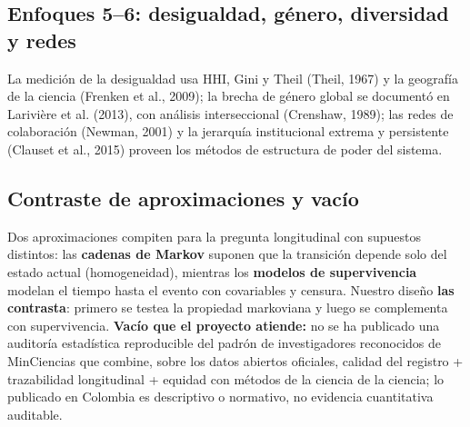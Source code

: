 \subsection{Enfoques 5--6: desigualdad, género, diversidad y redes}

La medición de la desigualdad usa HHI, Gini y Theil (Theil, 1967) y la
geografía de la ciencia (Frenken et al., 2009); la brecha de género global se
documentó en Larivière et al. (2013), con análisis interseccional (Crenshaw,
1989); las redes de colaboración (Newman, 2001) y la jerarquía institucional
extrema y persistente (Clauset et al., 2015) proveen los métodos de estructura
de poder del sistema.

\subsection{Contraste de aproximaciones y vacío}

Dos aproximaciones compiten para la pregunta longitudinal con supuestos
distintos: las \textbf{cadenas de Markov} suponen que la transición depende
solo del estado actual (homogeneidad), mientras los \textbf{modelos de
supervivencia} modelan el tiempo hasta el evento con covariables y censura.
Nuestro diseño \textbf{las contrasta}: primero se testea la propiedad
markoviana y luego se complementa con supervivencia. \textbf{Vacío que el
proyecto atiende:} no se ha publicado una auditoría estadística reproducible
del padrón de investigadores reconocidos de MinCiencias que combine, sobre los
datos abiertos oficiales, calidad del registro + trazabilidad longitudinal +
equidad con métodos de la ciencia de la ciencia; lo publicado en Colombia es
descriptivo o normativo, no evidencia cuantitativa auditable.
